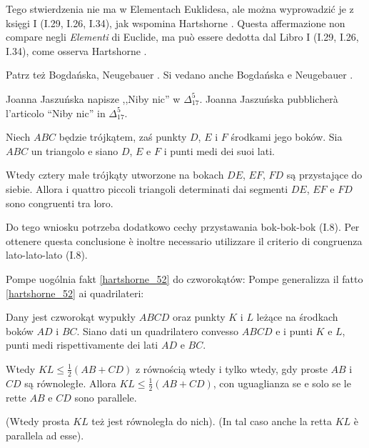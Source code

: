 Tego stwierdzenia nie ma w Elementach Euklidesa, ale można wyprowadzić je z księgi I (I.29, I.26, I.34), jak wspomina Hartshorne \cite[s. 45, 52. 53]{hartshorne_2000}. %
Questa affermazione non compare negli \emph{Elementi} di Euclide, ma può essere dedotta dal Libro I (I.29, I.26, I.34), come osserva Hartshorne \cite[s. 45, 52--53]{hartshorne_2000}. %

Patrz też Bogdańska, Neugebauer \cite[s. 15, 52]{neugebauer_2018}. %
Si vedano anche Bogdańska e Neugebauer \cite[s. 15, 52]{neugebauer_2018}. %

Joanna Jaszuńska napisze ,,Niby nic'' w $\Delta_{17}^5$. %
Joanna Jaszuńska pubblicherà l'articolo ``Niby nic'' in $\Delta_{17}^5$. %


\begin{corollary}
	Niech $ABC$ będzie trójkątem, zaś punkty $D$, $E$ i $F$ środkami jego boków. %
	Sia $ABC$ un triangolo e siano $D$, $E$ e $F$ i punti medi dei suoi lati. %

	Wtedy cztery małe trójkąty utworzone na bokach $DE$, $EF$, $FD$ są przystające do siebie. %
	Allora i quattro piccoli triangoli determinati dai segmenti $DE$, $EF$ e $FD$ sono congruenti tra loro. %
\end{corollary}

Do tego wniosku potrzeba dodatkowo cechy przystawania bok-bok-bok (I.8). %
Per ottenere questa conclusione è inoltre necessario utilizzare il criterio di congruenza lato-lato-lato (I.8). %


Pompe \cite[s. 40]{pompe_2022} uogólnia fakt \ref{hartshorne_52} do czworokątów: %
Pompe \cite[s. 40]{pompe_2022} generalizza il fatto \ref{hartshorne_52} ai quadrilateri: %

\begin{proposition}
	Dany jest czworokąt wypukły $ABCD$ oraz punkty $K$ i $L$ leżące na środkach boków $AD$ i $BC$. %
	Siano dati un quadrilatero convesso $ABCD$ e i punti $K$ e $L$, punti medi rispettivamente dei lati $AD$ e $BC$. %

	Wtedy $KL \le \frac 12 (AB +CD)$ z równością wtedy i tylko wtedy, gdy proste $AB$ i $CD$ są równoległe. %
	Allora $KL \le \frac 12 (AB + CD)$, con uguaglianza se e solo se le rette $AB$ e $CD$ sono parallele. %

	(Wtedy prosta $KL$ też jest równoległa do nich). %
	(In tal caso anche la retta $KL$ è parallela ad esse). %
\end{proposition}

